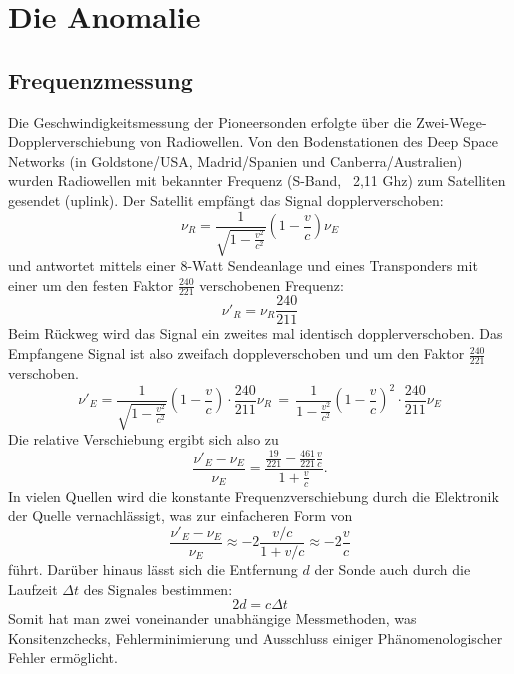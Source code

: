 \documentclass[a4paper,10pt]{article}
\begin{document}
\section{Die Anomalie}
\subsection{Frequenzmessung}

Die Geschwindigkeitsmessung der Pioneersonden erfolgte über die Zwei-Wege-Dopplerverschiebung von Radiowellen.
Von den Bodenstationen des Deep Space Networks (in Goldstone/USA, Madrid/Spanien und Canberra/Australien) wurden
Radiowellen mit bekannter Frequenz (S-Band, ~2,11 Ghz) zum Satelliten gesendet (uplink).
Der Satellit empfängt das Signal dopplerverschoben:
\begin{equation}
 \nu_R = \frac{1}{\sqrt{1-\frac{v^2}{c^2}}}(1-\frac{v}{c})\nu_E
\end{equation}
und antwortet mittels einer 8-Watt Sendeanlage und eines Transponders
mit einer um den festen Faktor $ \frac{240}{221} $ verschobenen Frequenz:
\begin{equation}
\nu'_R = \nu_R\frac{240}{211}
\end{equation}
Beim Rückweg wird das Signal ein zweites mal identisch dopplerverschoben.
Das Empfangene Signal ist also zweifach doppleverschoben und um den Faktor $\frac{240}{221}$ verschoben.
\begin{equation}
 \nu'_E = \frac{1}{\sqrt{1-\frac{v^2}{c^2}}}(1-\frac{v}{c}) \cdot \frac{240}{211}\nu_R \, = \, \frac{1}{1-\frac{v^2}{c^2}}(1-\frac{v}{c})^2 \cdot \frac{240}{211} \nu_E
\end{equation}
Die relative Verschiebung ergibt sich also zu
\begin{equation}
 \frac{\nu'_E-\nu_E}{\nu_E} = \frac{\frac{19}{221}- \frac{461}{221}\frac{v}{c}}{1+\frac{v}{c}}.
\end{equation}
In vielen Quellen wird die konstante Frequenzverschiebung durch die Elektronik der Quelle vernachlässigt, was zur einfacheren Form von
\begin{equation}
 \frac{\nu'_E-\nu_E}{\nu_E} \approx -2\frac{v/c}{1+v/c} \approx -2 \frac{v}{c}
\end{equation}
führt.
Darüber hinaus lässt sich die Entfernung $d$ der Sonde auch durch die Laufzeit $\Delta t$ des Signales bestimmen:
\begin{equation}
 2d = c \Delta t
\end{equation}
Somit hat man zwei voneinander unabhängige Messmethoden, was Konsitenzchecks,
Fehlerminimierung und Ausschluss einiger Phänomenologischer Fehler ermöglicht.
\end{document}
